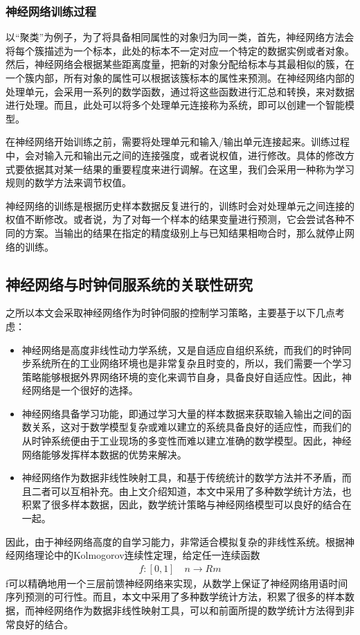 \subsubsection{神经网络训练过程}
以“聚类”为例子，为了将具备相同属性的对象归为同一类，首先，神经网络方法会将每个簇描述为一个标本，此处的标本不一定对应一个特定的数据实例或者对象。然后，神经网络会根据某些距离度量，把新的对象分配给标本与其最相似的簇，在一个簇内部，所有对象的属性可以根据该簇标本的属性来预测。在神经网络内部的处理单元，会采用一系列的数学函数，通过将这些函数进行汇总和转换，来对数据进行处理。而且，此处可以将多个处理单元连接称为系统，即可以创建一个智能模型。

在神经网络开始训练之前，需要将处理单元和输入/输出单元连接起来。训练过程中，会对输入元和输出元之间的连接强度，或者说权值，进行修改。具体的修改方式要依据其对某一结果的重要程度来进行调解。在这里，我们会采用一种称为学习规则的数学方法来调节权值。

神经网络的训练是根据历史样本数据反复进行的，训练时会对处理单元之间连接的权值不断修改。或者说，为了对每一个样本的结果变量进行预测，它会尝试各种不同的方案。当输出的结果在指定的精度级别上与已知结果相吻合时，那么就停止网络的训练。

\subsection{神经网络与时钟伺服系统的关联性研究}
之所以本文会采取神经网络作为时钟伺服的控制学习策略，主要基于以下几点考虑：
\begin{itemize}[noitemsep,topsep=0pt,parsep=0pt,partopsep=0pt]
	\item 神经网络是高度非线性动力学系统，又是自适应自组织系统，而我们的时钟同步系统所在的工业网络环境也是非常复杂且时变的，所以，我们需要一个学习策略能够根据外界网络环境的变化来调节自身，具备良好自适应性。因此，神经网络是一个很好的选择。
	\item 神经网络具备学习功能，即通过学习大量的样本数据来获取输入输出之间的函数关系，这对于数学模型复杂或难以建立的系统具备良好的适应性，而我们的从时钟系统便由于工业现场的多变性而难以建立准确的数学模型。因此，神经网络能够发挥样本数据的优势来解决。
	\item 神经网络作为数据非线性映射工具，和基于传统统计的数学方法并不矛盾，而且二者可以互相补充。由上文介绍知道，本文中采用了多种数学统计方法，也积累了很多样本数据，因此，数学统计策略与神经网络模型可以良好的结合在一起。
\end{itemize}

因此，由于神经网络高度的自学习能力，非常适合模拟复杂的非线性系统。根据神经网络理论中的Kolmogorov连续性定理，给定任一连续函数
\begin{align}
f:[0,1] \quad n \rightarrow Rm
\end{align}
f可以精确地用一个三层前馈神经网络来实现，从数学上保证了神经网络用语时间序列预测的可行性。而且，本文中采用了多种数学统计方法，积累了很多的样本数据，而神经网络作为数据非线性映射工具，可以和前面所提的数学统计方法得到非常良好的结合。

